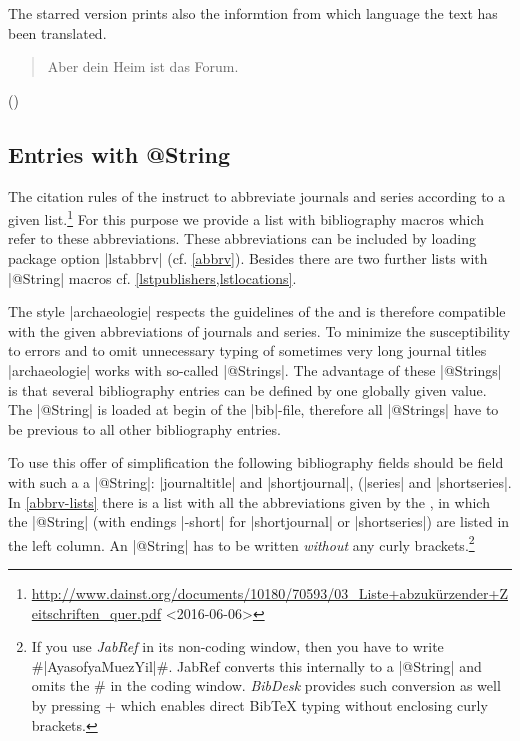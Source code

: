 \documentclass[a4paper,
10pt,
greek,
french,
spanish,
italian,
ngerman,
english,
]{ltxdoc}
\begin{document}
The starred version prints also the informtion from which language the text has been translated.

\begin{example}
\blockcquote[12,25,1]{Cic:Att}{Aber dein Heim ist das Forum.} ()
\end{example}



\subsection{Entries with @String}\label{string}
The citation rules of the \DAI instruct to abbreviate journals and series according to a given list.\footnote{\url{http://www.dainst.org/documents/10180/70593/03_Liste+abzukürzender+Zeitschriften_quer.pdf} <2016-06-06>}
For this purpose we provide a list with bibliography macros which refer to these abbreviations. 
These abbreviations can be included by loading package option |lstabbrv| (cf. \cref{abbrv}). 
Besides there are two further lists with |@String| macros cf. \cref{lstpublishers,lstlocations}.

 The style |archaeologie| respects the guidelines of the \DAI 
and is therefore compatible with the given abbreviations of journals and series.
To minimize the susceptibility to errors and to omit unnecessary typing of sometimes very long journal titles |archaeologie| works with so-called |@Strings|.
The advantage of these |@Strings| is that several bibliography entries can be defined by one globally given value. 
The |@String| is loaded at begin of the |bib|-file, therefore all |@Strings| have to be previous to all other bibliography entries.
 
To use this offer of simplification the following bibliography fields should be field with such a a |@String|: |journaltitle| and |shortjournal|,
(|series| and |shortseries|.
In \cref{abbrv-lists} there is a list with all the abbreviations given by the \DAI, 
in which the |@String| (with endings |-short| for |shortjournal| or |shortseries|) are listed in the left column.  
An |@String| has to be written \emph{without} any curly brackets.\footnote{If you use \emph{JabRef} in its non-coding window, 
then you have to write \#|AyasofyaMuezYil|\#. 
JabRef converts this internally to a |@String| and omits the \# in the coding window. 
\emph{BibDesk} provides such conversion as well by pressing
\LKeyStrg + 
 which enables direct BibTeX typing without enclosing curly brackets.}
\end{document}
